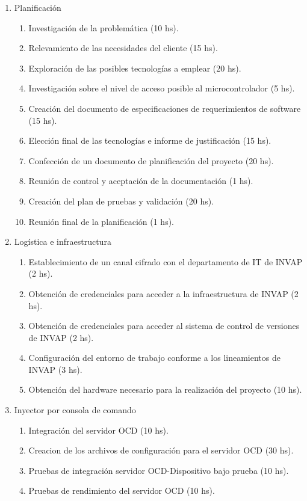 \documentclass[
11pt, %
]{charter}
\begin{document}
\begin{enumerate}
\item Planificación
	\begin{enumerate}
	\item Investigación de la problemática (10 hs).
	\item Relevamiento de las necesidades del cliente (15 hs).
	\item Exploración de las posibles tecnologías a emplear (20 hs).
	\item Investigación sobre el nivel de acceso posible al microcontrolador (5 hs).
	\item Creación del documento de especificaciones de requerimientos de software (15 hs).
	\item Elección final de las tecnologías e informe de justificación (15 hs).
	\item Confección de un documento de planificación del proyecto (20 hs).
	\item Reunión de control y aceptación de la documentación (1 hs).
	\item Creación del plan de pruebas y validación (20 hs).
	\item Reunión final de la planificación (1 hs).
	\end{enumerate}
\item Logística e infraestructura
	\begin{enumerate}
	\item Establecimiento de un canal cifrado con el departamento de IT de INVAP (2 hs).
	\item Obtención de credenciales para acceder a la infraestructura de INVAP (2 hs).
	\item Obtención de credenciales para acceder al sistema de control de versiones de INVAP (2 hs).
	\item Configuración del entorno de trabajo conforme a los lineamientos de INVAP (3 hs).
	\item Obtención del hardware necesario para la realización del proyecto (10 hs).
	\end{enumerate}
\item Inyector por consola de comando
	\begin{enumerate}
	\item Integración del servidor OCD (10 hs).
	\item Creacion de los archivos de configuración para el servidor OCD (30 hs).
	\item Pruebas de integración servidor OCD-Dispositivo bajo prueba (10 hs).
	\item Pruebas de rendimiento del servidor OCD (10 hs).

\end{enumerate}
\end{enumerate}
\end{document}
